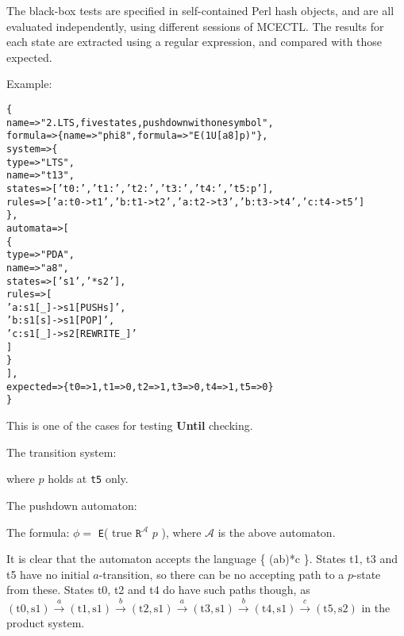\documentclass[11pt]{article}
\theoremstyle{definition}
\begin{document}
The black-box tests are specified in self-contained Perl hash objects, and are
all evaluated independently, using different sessions of MCECTL. The results
for each state are extracted using a regular expression, and compared with
those expected.

Example:
\begin{alltt}
\{
   name     => "2. LTS, five states, pushdown with one symbol",
   formula  => \{ name => "phi8", formula => "E( 1 U[a8] p )" \},
   system   => \{
      type => "LTS", 
      name => "t13", 
      states => ['t0 : ' ,'t1 : ' ,'t2 : ' ,'t3 : ' ,'t4 : ' ,'t5 : p'],
      rules => [ 'a:t0->t1' ,'b:t1->t2' ,'a:t2->t3' ,'b:t3->t4' ,'c:t4->t5']
   \},
   automata => [
      \{
         type => "PDA",
         name => "a8",
         states => [ 's1', '*s2' ],
         rules => [
            'a: s1[_] -> s1[PUSH s]',
            'b: s1[s] -> s1[POP]',
            'c: s1[_] -> s2[REWRITE _]'
         ]
      \}
   ],
   expected => \{ t0 => 1, t1 => 0, t2 => 1, t3 => 0, t4 => 1, t5 => 0\}
\}
\end{alltt}

This is one of the cases for testing \textbf{Until} checking.

The transition system:


where $p$ holds at \texttt{t5} only.

The pushdown automaton:


The formula: $\phi = $ \texttt{E}( true $\texttt{R}^{\mathcal{A}}$ $p$ ), where
$\mathcal{A}$ is the above automaton.

It is clear that the automaton accepts the language \{ (ab)*c \}. States t1, t3
and t5 have no initial $a$-transition, so there can be no accepting path to a
$p$-state from these. States t0, t2 and t4 do have such paths though, as
$(\text{t0}, \text{s1}) \xrightarrow{a} (\text{t1}, \text{s1}) \xrightarrow{b}
(\text{t2}, \text{s1}) \xrightarrow{a} (\text{t3}, \text{s1}) \xrightarrow{b}
(\text{t4}, \text{s1}) \xrightarrow{c} (\text{t5}, \text{s2})$ in the product
system.
\end{document}

